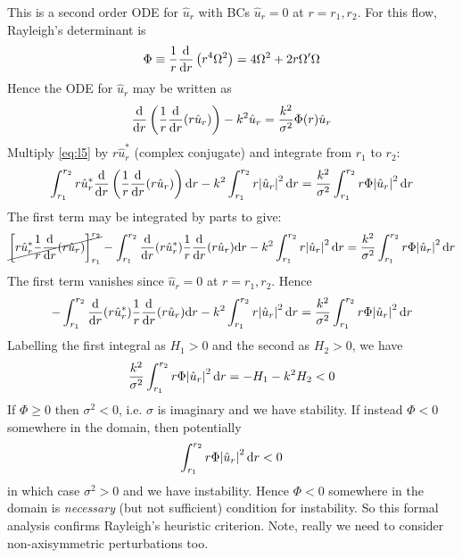 \documentclass{jknotes}
\begin{document}
This is a second order ODE for $\hat{u}_r$ with BCs $\hat{u}_r = 0$ at $r=
r_1, r_2$. For this flow, Rayleigh's determinant is
\begin{equation}
	\Phi \equiv \frac{1}{r}
	\frac{\diffd}{\diffd r}\left( r^4 \Omega^2 \right) = 4\Omega^2 + 2r\Omega'
	\Omega
\end{equation}
Hence the ODE for $\hat{u}_r$ may be written as
\begin{equation}
	\frac{\diffd}{\diffd r}\left(\frac{1}{r}\frac{\diffd}{\diffd
	r}(r\hat{u}_r)\right) - k^2 \hat{u}_r = \frac{k^2}{\sigma^2} \Phi(r)
	\hat{u}_r
	\label{eq:l5}
\end{equation}
Multiply \eqref{eq:l5} by $r\hat{u}_r^*$ (complex conjugate) and integrate
from $r_1$ to $r_2$:
\begin{equation}
	\int_{r_1}^{r_2} r \hat{u}_r^* \frac{\diffd}{\diffd r} \left(
	\frac{1}{r}\frac{\diffd}{\diffd r}(r\hat{u}_r)\right) \diffd r - k^2
	\int_{r_1}^{r_2} r \abs{\hat{u}_r}^2 \, \diffd r = \frac{k^2}{\sigma^2}
	\int_{r_1}^{r_2} r \Phi \abs{\hat{u}_r}^2 \, \diffd r
\end{equation}
The first term may be integrated by parts to give:
\begin{equation}
	\cancel{\left[ r\hat{u}_r^* \frac{1}{r} \frac{\diffd}{\diffd
	r}(r\hat{u}_r)\right]_{r_1}^{r_2}}
	-\int_{r_1}^{r_2} \frac{\diffd}{\diffd r}(r \hat{u}_r^*)\frac{1}{r} \frac{\diffd}{\diffd r} (r\hat{u}_r) \diffd r - k^2
	\int_{r_1}^{r_2} r \abs{\hat{u}_r}^2 \, \diffd r = \frac{k^2}{\sigma^2}
	\int_{r_1}^{r_2} r \Phi \abs{\hat{u}_r}^2 \, \diffd r
\end{equation}
The first term vanishes since $\hat{u}_r =0$ at $r=r_1,r_2$. Hence
\begin{equation}
	-\int_{r_1}^{r_2} \frac{\diffd}{\diffd r}(r \hat{u}_r^*)\frac{1}{r} \frac{\diffd}{\diffd r} (r\hat{u}_r) \diffd r - k^2
	\int_{r_1}^{r_2} r \abs{\hat{u}_r}^2 \, \diffd r = \frac{k^2}{\sigma^2}
	\int_{r_1}^{r_2} r \Phi \abs{\hat{u}_r}^2 \, \diffd r
\end{equation}
Labelling the first integral as $H_1 > 0$ and the second as $H_2 > 0$, we have
\begin{equation}
	\frac{k^2}{\sigma^2}
	\int_{r_1}^{r_2} r \Phi \abs{\hat{u}_r}^2 \, \diffd r = -H_1 - k^2 H_2 < 0
\end{equation}
If $\Phi \ge 0$ then $\sigma^2 < 0$, i.e. $\sigma$ is imaginary and we have
stability. If instead $\Phi < 0$ somewhere in the domain, then potentially
\begin{equation}
	\int_{r_1}^{r_2} r \Phi \abs{\hat{u}_r}^2 \, \diffd r < 0
\end{equation}
in which case $\sigma^2 > 0$ and we have instability. Hence $\Phi < 0$
somewhere in the domain is \emph{necessary} (but not sufficient) condition for
instability. So this formal analysis confirms Rayleigh's heuristic criterion.
Note, really we need to consider non-axisymmetric perturbations too.
\end{document}
